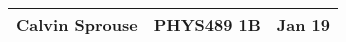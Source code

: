 \documentclass[a4paper, 12pt]{config/homework}
\begin{document}
\noindent
\begin{tabularx}{\textwidth}{>{\centering\arraybackslash}X>{\centering\arraybackslash}X>{\centering\arraybackslash}X}
Calvin Sprouse & PHYS489 1B & 2024 Jan 19\\
\midrule
\end{tabularx}




\end{document}
